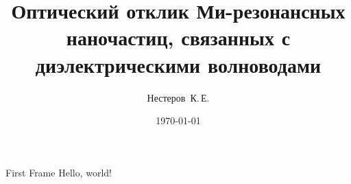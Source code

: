 \documentclass[12pt, pdf, hyperref={unicode}]{beamer}
\title{Оптический отклик Ми-резонансных наночастиц, связанных с диэлектрическими волноводами}
\date{\today}
\author{Нестеров~К.\,Е.}
\begin{document}
  \maketitle
  
  \begin{frame}{First Frame}
    Hello, world!
  \end{frame}
\end{document}
